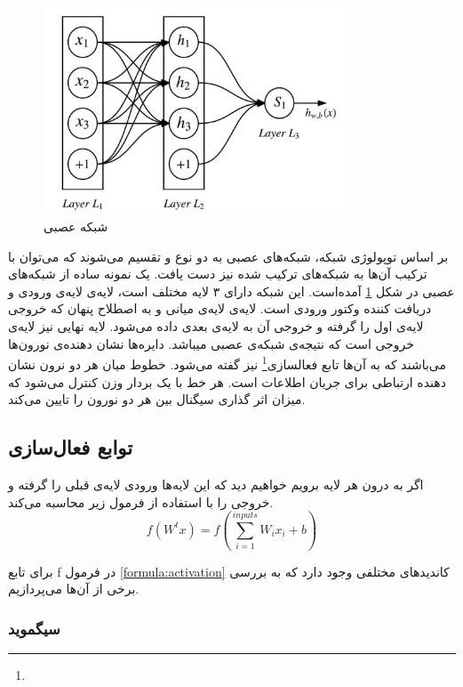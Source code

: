 \documentclass[12pt, a4paper, oneside]{report}
\begin{document}
\begin{figure}[!ht]
    \centering
    \includegraphics[width=0.80\textwidth]{FFNN}
    \caption{شبکه عصبی }
    \label{fig:ffnn}
\end{figure}

بر اساس توپولوژی شبکه، شبکه‌های عصبی به دو نوع 
و
تقسیم می‌شوند که می‌توان با ترکیب آن‌ها به شبکه‌های ترکیب شده نیز دست یافت.
یک نمونه ساده از شبکه‌های عصبی
در شکل
\ref{fig:ffnn}
آمده‌است. این شبکه دارای ۳ لایه مختلف است، لایه‌ی
لایه‌ی ورودی و دریافت کننده وکتور ورودی است. لایه‌ی
لایه‌ی میانی و به اصطلاح پنهان که خروجی لایه‌ی اول را گرفته و خروجی آن به لایه‌ی بعدی داده می‌شود. لایه نهایی نیز لایه‌ی
خروجی است که نتیجه‌ی شبکه‌ی عصبی میباشد.
دایره‌ها نشان دهنده‌ی نورون‌ها می‌باشند که به آن‌ها
تابع فعالسازی\footnote{}
نیز گفته می‌شود. خطوط میان هر دو نرون نشان دهنده ارتباطی برای جریان اطلاعات است. هر خط با یک بردار وزن کنترل می‌شود
که میزان اثر گذاری سیگنال بین هر دو نورون را تایین می‌کند.

\subsection{توابع فعال‌سازی}

اگر به درون هر لایه برویم خواهیم دید که این لایه‌ها ورودی لایه‌ی قبلی را گرفته و خروجی را با استفاده از فرمول زیر
محاسبه می‌کند.
\begin{equation}
    f(W^tx)=f(\sum_{i=1}^{inputs} W_ix_i + b)
    \label{formula:activation}
\end{equation}

برای تابع
f
در فرمول
\ref{formula:activation}
کاندیدهای مختلفی وجود دارد که به بررسی برخی از آن‌ها می‌پردازیم.

\subsubsection{سیگموید}
\end{document}
